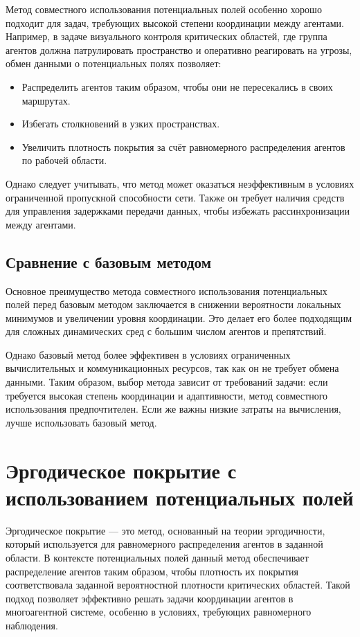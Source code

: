 Метод совместного использования потенциальных полей особенно хорошо подходит для задач, требующих высокой степени координации между агентами. Например, в задаче визуального контроля критических областей, где группа агентов должна патрулировать пространство и оперативно реагировать на угрозы, обмен данными о потенциальных полях позволяет:

\begin{itemize}
	\item Распределить агентов таким образом, чтобы они не пересекались в своих маршрутах.
	\item Избегать столкновений в узких пространствах.
	\item Увеличить плотность покрытия за счёт равномерного распределения агентов по рабочей области.
\end{itemize}

Однако следует учитывать, что метод может оказаться неэффективным в условиях ограниченной пропускной способности сети. Также он требует наличия средств для управления задержками передачи данных, чтобы избежать рассинхронизации между агентами.

\subsection{Сравнение с базовым методом}

Основное преимущество метода совместного использования потенциальных полей перед базовым методом заключается в снижении вероятности локальных минимумов и увеличении уровня координации. Это делает его более подходящим для сложных динамических сред с большим числом агентов и препятствий.

Однако базовый метод более эффективен в условиях ограниченных вычислительных и коммуникационных ресурсов, так как он не требует обмена данными. Таким образом, выбор метода зависит от требований задачи: если требуется высокая степень координации и адаптивности, метод совместного использования предпочтителен. Если же важны низкие затраты на вычисления, лучше использовать базовый метод.

\section{Эргодическое покрытие с использованием потенциальных полей}

Эргодическое покрытие — это метод, основанный на теории эргодичности, который используется для равномерного распределения агентов в заданной области. В контексте потенциальных полей данный метод обеспечивает распределение агентов таким образом, чтобы плотность их покрытия соответствовала заданной вероятностной плотности критических областей. Такой подход позволяет эффективно решать задачи координации агентов в многоагентной системе, особенно в условиях, требующих равномерного наблюдения.

